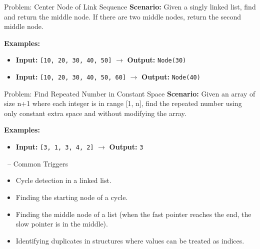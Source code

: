 \begin{frame}[fragile]{Problem: Center Node of Link Sequence}
  \textbf{Scenario:}
  Given a singly linked list, find and return the middle node. If there are two middle nodes, return the second middle node.
  
  \vspace{0.3cm}
  \textbf{Examples:}
  \begin{itemize}
    \item \textbf{Input:} \texttt{[10, 20, 30, 40, 50]} $\rightarrow$ \textbf{Output:} \texttt{Node(30)}
    \item \textbf{Input:} \texttt{[10, 20, 30, 40, 50, 60]} $\rightarrow$ \textbf{Output:} \texttt{Node(40)}
  \end{itemize}
\end{frame}

\begin{frame}[fragile]{Problem: Find Repeated Number in Constant Space}
  \textbf{Scenario:}
  Given an array of size n+1 where each integer is in range [1, n], find the repeated number using only constant extra space and without modifying the array.
  
  \vspace{0.3cm}
  \textbf{Examples:}
  \begin{itemize}
    \item \textbf{Input:} \texttt{[3, 1, 3, 4, 2]} $\rightarrow$ \textbf{Output:} \texttt{3}
  \end{itemize}
\end{frame}

\begin{frame}{\secname\ -- Common Triggers}
  \begin{itemize}
    \item Cycle detection in a linked list.
        \item Finding the starting node of a cycle.
        \item Finding the middle node of a list (when the fast pointer reaches the end, the slow pointer is in the middle).
        \item Identifying duplicates in structures where values can be treated as indices.
  \end{itemize}
\end{frame}
